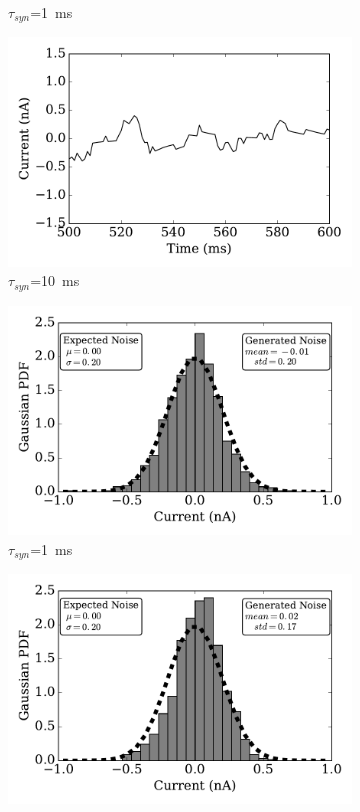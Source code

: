 \begin{figure}[btp!]
\begin{subfigure}[t]{0.49\textwidth}
		\caption{$\tau_{syn}$=1~ms}
	\end{subfigure}
	\begin{subfigure}[t]{0.49\textwidth}
		\includegraphics[width=\textwidth]{pics_iconip/curr_tau10.pdf}
		\caption{$\tau_{syn}$=10~ms}
	\end{subfigure}
	\begin{subfigure}[t]{0.49\textwidth}
		\includegraphics[width=\textwidth]{pics_iconip/distr_tau1.pdf}
		\caption{$\tau_{syn}$=1~ms}
	\end{subfigure}
	\begin{subfigure}[t]{0.49\textwidth}
		\includegraphics[width=\textwidth]{pics_iconip/distr_tau10.pdf}

\end{subfigure}
\end{figure}
